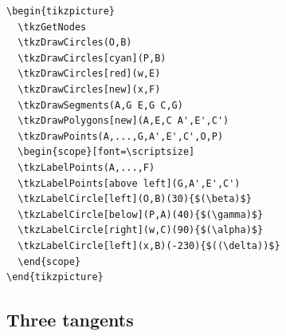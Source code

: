 \begin{verbatim}
\begin{tikzpicture}
  \tkzGetNodes
  \tkzDrawCircles(O,B)
  \tkzDrawCircles[cyan](P,B)
  \tkzDrawCircles[red](w,E)
  \tkzDrawCircles[new](x,F)
  \tkzDrawSegments(A,G E,G C,G)
  \tkzDrawPolygons[new](A,E,C A',E',C')
  \tkzDrawPoints(A,...,G,A',E',C',O,P)
  \begin{scope}[font=\scriptsize]
  \tkzLabelPoints(A,...,F)
  \tkzLabelPoints[above left](G,A',E',C')
  \tkzLabelCircle[left](O,B)(30){$(\beta)$}
  \tkzLabelCircle[below](P,A)(40){$(\gamma)$}
  \tkzLabelCircle[right](w,C)(90){$(\alpha)$}
  \tkzLabelCircle[left](x,B)(-230){$((\delta))$}
  \end{scope}
\end{tikzpicture}
\end{verbatim}

\subsection{Three tangents}

